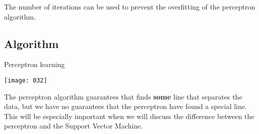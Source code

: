 The number of iterations can be used to prevent the overfitting of the perceptron algorithm.

\subsection{Algorithm}

\begin{algorithm}
\caption{Perceptron learning}
\label{alg:perceptron}
\end{algorithm}

\begin{center}
    \texttt{[image: 032]}
    \label{fig:032}
\end{center}

The perceptron algorithm guarantees that finds \textbf{some} line that separates the data, but we have no guarantees that the perceptron have found a special line. This will be especially important when we will discuss the difference between the perceptron and the Support Vector Machine.